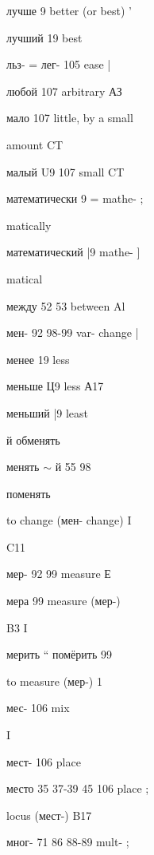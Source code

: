 \clearpage
\thispagestyle{plain}
\begingroup
\cyrillicfont
\fontsize{7.25}{8.25}\selectfont
\setlength{\parindent}{0pt}
\setlength{\parskip}{0pt}
\setlength{\emergencystretch}{1.5em}
\noindent
\begin{minipage}[t]{0.475\textwidth}
\raggedright
\noindent лучше 9 better (or best) ’\par
\noindent лучший 19 best\par
\noindent льз- = лег- 105 ease |\par
\noindent любой 107 arbitrary АЗ\par
\noindent мало 107 little, by a small\par
\noindent amount CT\par
\noindent малый U9 107 small CT\par
\noindent математически 9 = mathe- ;\par
\noindent matically\par
\noindent математический |9 mathe- ]\par
\noindent matical\par
\noindent между 52 53 between Al\par
\noindent мен- 92 98-99 var- change |\par
\noindent менее 19 less\par
\noindent меньше Ц9 less А17\par
\noindent меньший |9 least\par
\noindent й обменять\par
\noindent менять $\sim$ й 55 98\par
\noindent поменять\par
\noindent to change (мен- change) I\par
\noindent C11\par
\noindent мер- 92 99 measure Е\par
\noindent мера 99 measure (мер-)\par
\noindent B3 I\par
\noindent мерить “ помёрить 99\par
\noindent to measure (мер-) 1\par
\noindent мес- 106 mix\par
\noindent I\par
\noindent мест- 106 place\par
\noindent место 35 37-39 45 106 place ;\par
\noindent locus (мест-) B17\par
\noindent мног- 71 86 88-89 mult- ;\par

\end{minipage}
